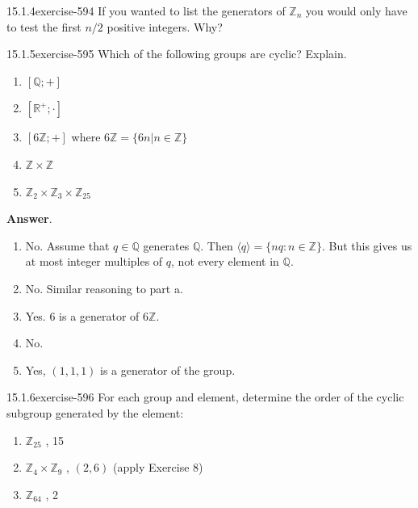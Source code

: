 \documentclass[twoside,10pt,]{book}
\numberwithin{equation}{section}
\begin{document}
\begin{divisionsolution}{15.1.4}{}{exercise-594}%
\hypertarget{p-5339}{}%
If you wanted to list the generators of \(\mathbb{Z}_n\) you would only have to test the first \(n/2\) positive integers. Why?%
\end{divisionsolution}%
\begin{divisionsolution}{15.1.5}{}{exercise-595}%
\hypertarget{p-5340}{}%
Which of the following groups are cyclic? Explain.\leavevmode%
\begin{enumerate}[label=(\alph*)]
\item\hypertarget{li-2394}{}\hypertarget{p-5341}{}%
\([\mathbb{Q}; +]\)%
\item\hypertarget{li-2395}{}\hypertarget{p-5342}{}%
\([\mathbb{R}^+;\cdot ]\)%
\item\hypertarget{li-2396}{}\hypertarget{p-5343}{}%
\([6\mathbb{Z}; +]\) where \(6\mathbb{Z} = \{6n |n \in  \mathbb{Z}\}\)%
\item\hypertarget{li-2397}{}\hypertarget{p-5344}{}%
\(\mathbb{Z} \times  \mathbb{Z}\)%
\item\hypertarget{li-2398}{}\hypertarget{p-5345}{}%
\(\mathbb{Z}_2\times  \mathbb{Z}_3 \times  \mathbb{Z}_{25}\)%
\end{enumerate}
%
\par\smallskip%
\noindent\textbf{Answer}.\quad%
\hypertarget{p-5346}{}%
\leavevmode%
\begin{enumerate}[label=(\alph*)]
\item\hypertarget{li-2399}{}\hypertarget{p-5347}{}%
No. Assume that \(q \in \mathbb{Q}\) generates \(\mathbb{Q}\). Then \(\langle q\rangle  = \{n q : n \in \mathbb{Z}\}\). But this gives us at most integer multiples of \(q\), not every element in \(\mathbb{Q}\).%
\item\hypertarget{li-2400}{}\hypertarget{p-5348}{}%
No. Similar reasoning to part a.%
\item\hypertarget{li-2401}{}\hypertarget{p-5349}{}%
Yes. 6 is a generator of \(6\mathbb{Z}\).%
\item\hypertarget{li-2402}{}\hypertarget{p-5350}{}%
No.%
\item\hypertarget{li-2403}{}\hypertarget{p-5351}{}%
Yes, \((1,1, 1)\) is a generator of the group.%
\end{enumerate}
%
\end{divisionsolution}%
\begin{divisionsolution}{15.1.6}{}{exercise-596}%
\hypertarget{p-5352}{}%
For each group and element, determine the order of the cyclic subgroup generated by the element:\leavevmode%
\begin{enumerate}[label=(\alph*)]
\item\hypertarget{li-2404}{}\hypertarget{p-5353}{}%
\(\mathbb{Z}_{25}\) , 15%
\item\hypertarget{li-2405}{}\hypertarget{p-5354}{}%
\(\mathbb{Z}_4\times \mathbb{Z}_9\) , \((2, 6)\) (apply Exercise 8)%
\item\hypertarget{li-2406}{}\hypertarget{p-5355}{}%
\(\mathbb{Z}_{64}\) , 2%
\end{enumerate}
%
\end{divisionsolution}%
\end{document}
